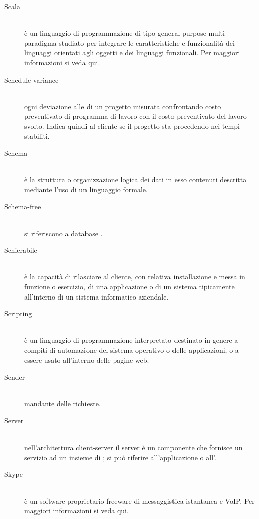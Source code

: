 \documentclass[12pt,a4paper]{article}
\begin{document}
\begin{description}
\item[Scala] 
\hfill\\è un linguaggio di programmazione di tipo general-purpose multi-paradigma studiato per integrare le caratteristiche e funzionalità dei linguaggi orientati agli oggetti e dei linguaggi funzionali. Per maggiori informazioni si veda \href{https://it.wikipedia.org/wiki/Scala_(linguaggio_di_programmazione)}{qui}.

\item[Schedule variance] 
\hfill\\ogni deviazione alle  di un progetto misurata confrontando costo preventivato di programma di lavoro con il costo preventivato del lavoro svolto. Indica quindi al cliente se il progetto sta procedendo nei tempi stabiliti.

\item[Schema] 
\hfill\\è la struttura o organizzazione logica dei dati in esso contenuti descritta mediante l'uso di un linguaggio formale.

\item[Schema-free] 
\hfill\\si riferiscono a database .

\item[Schierabile] 
\hfill\\è la capacità di rilasciare al cliente, con relativa installazione e messa in funzione o esercizio, di una applicazione o di un sistema  tipicamente all'interno di un sistema informatico aziendale.

\item[Scripting] 
\hfill\\è un linguaggio di programmazione interpretato destinato in genere a compiti di automazione del sistema operativo o delle applicazioni, o a essere usato all'interno delle pagine web.

\item[Sender] 
\hfill\\mandante delle richieste.

\item[Server] 
\hfill\\nell'architettura client-server il server è un componente che fornisce un servizio ad un insieme di ; si può riferire all'applicazione o all'.

\item[Skype] 
\hfill\\è un software proprietario freeware di messaggistica istantanea e VoIP. Per maggiori informazioni si veda \href{https://it.wikipedia.org/wiki/Skype}{qui}.


\end{description}
\end{document}
